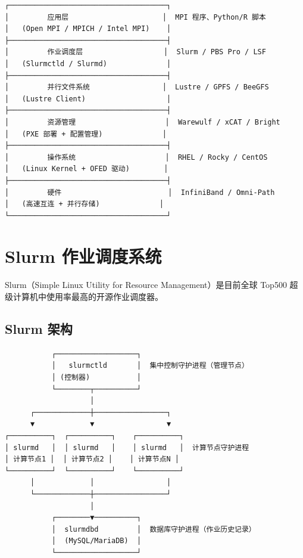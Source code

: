 \documentclass[12pt,UTF8]{ctexbook}
\begin{document}
\begin{lstlisting}
┌─────────────────────────────────────┐
│         应用层                      │  MPI 程序、Python/R 脚本
│   (Open MPI / MPICH / Intel MPI)    │
├─────────────────────────────────────┤
│         作业调度层                   │  Slurm / PBS Pro / LSF
│   (Slurmctld / Slurmd)              │
├─────────────────────────────────────┤
│         并行文件系统                 │  Lustre / GPFS / BeeGFS
│   (Lustre Client)                   │
├─────────────────────────────────────┤
│         资源管理                     │  Warewulf / xCAT / Bright
│   (PXE 部署 + 配置管理)              │
├─────────────────────────────────────┤
│         操作系统                     │  RHEL / Rocky / CentOS
│   (Linux Kernel + OFED 驱动)        │
├─────────────────────────────────────┤
│         硬件                         │  InfiniBand / Omni-Path
│   (高速互连 + 并行存储)              │
└─────────────────────────────────────┘
\end{lstlisting}

\section{Slurm 作业调度系统}
\label{sec:slurm}

Slurm（Simple Linux Utility for Resource Management）是目前全球 Top500 超级计算机中使用率最高的开源作业调度器。

\subsection{Slurm 架构}

\begin{lstlisting}
           ┌───────────────────┐
           │   slurmctld       │  集中控制守护进程（管理节点）
           │ (控制器)           │
           └────────┬──────────┘
                    │
      ┌─────────────┼─────────────────┐
      ▼             ▼                 ▼
┌──────────┐  ┌──────────┐    ┌──────────┐
│ slurmd   │  │ slurmd   │    │ slurmd   │  计算节点守护进程
│ 计算节点1 │  │ 计算节点2 │    │ 计算节点N │
└──────────┘  └──────────┘    └──────────┘
      │             │                 │
      └─────────────┼─────────────────┘
                    │
           ┌────────▼──────────┐
           │  slurmdbd         │  数据库守护进程（作业历史记录）
           │  (MySQL/MariaDB)  │
           └───────────────────┘
\end{lstlisting}
\end{document}
